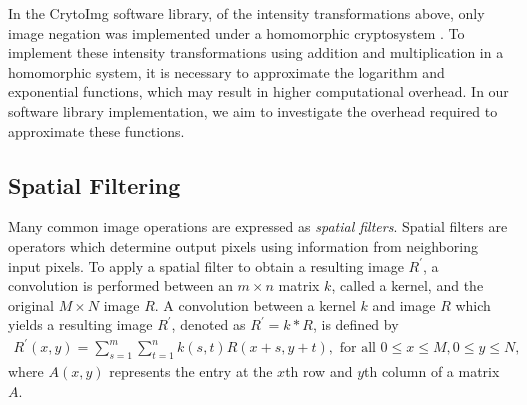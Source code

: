 In the CrytoImg software library, of the intensity transformations above, only image negation was implemented under a homomorphic cryptosystem \cite{ziad_cryptoimg:_2016}. To implement these intensity transformations using addition and multiplication in a homomorphic system, it is necessary to approximate the logarithm and exponential functions, which may result in higher computational overhead. In our software library implementation, we aim to investigate the overhead required to approximate these functions.

\subsection{Spatial Filtering}
Many common image operations are expressed as \textit{spatial filters}. Spatial filters are operators which determine output pixels using information from neighboring input pixels. To apply a spatial filter to obtain a resulting image $R^\prime$, a convolution is performed between an $m \times n$ matrix $k$, called a kernel, and the original $M\times N$ image $R$.
A convolution between a kernel $k$ and image $R$ which yields a resulting image $R^\prime$, denoted as $R^\prime = k \ast R$, is defined by
\begin{align} \label{eq:spatialfilter}
	R^\prime(x,y) = \sum_{s=1}^m{\sum_{t=1}^n{k(s,t)R(x+s,y+t)}}, \text{ for all } 0\leq x \leq M, 0 \leq y \leq N,
\end{align}
where $A(x,y)$ represents the entry at the $x$th row and $y$th column of a matrix $A$.

